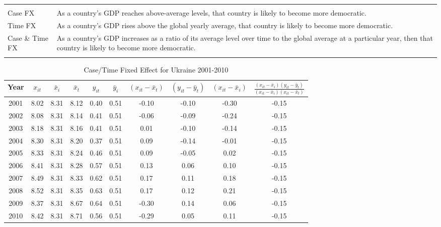 \documentclass{article}[12pt]
\begin{document}
\begin{tabular}{lp{14cm}}
	& \\
	Case FX & As a country's GDP reaches above-average levels, that country is likely to become more democratic. \\[1em]
	Time FX & As a country's GDP rises above the global yearly average, that country is likely to become more democratic. \\[1em]
	Case \& Time FX & As a country's GDP increases as a ratio of its average level over time to the global average at a particular year, then that country is likely to become more democratic.\\
	& \\
\end{tabular}

\begin{table}[ht]
	\centering
	
	\begin{tabular}{cccccccccc}
		
		Year & $x_{it}$ & $\bar{x}_i$ & $\bar{x}_t$ & $y_{it}$ & $\bar{y}_i$ &  $(x_{it}  - \bar{x}_t)$ & $(y_{it} - \bar{y}_t)$ & $(x_{it}  - \bar{x}_i)$ & $\frac{(x_{it}  - \bar{x}_i)(y_{it} - \bar{y}_t)}{(x_{it}  - \bar{x}_i)(x_{it} - \bar{x}_t)}$ \\
		\midrule
		2001 & 8.02 & 8.31 & 8.12 & 0.40 & 0.51 & -0.10 & -0.10 & -0.30 & -0.15 \\ 2002 & 8.08 & 8.31 & 8.14 & 0.41 & 0.51 & -0.06 & -0.09 & -0.24 & -0.15 \\ 2003 & 8.18 & 8.31 & 8.16 & 0.41 & 0.51 & 0.01 & -0.10 & -0.14 & -0.15 \\ 2004 & 8.30 & 8.31 & 8.20 & 0.37 & 0.51 & 0.09 & -0.14 & -0.01 & -0.15 \\ 2005 & 8.33 & 8.31 & 8.24 & 0.46 & 0.51 & 0.09 & -0.05 & 0.02 & -0.15 \\ 2006 & 8.41 & 8.31 & 8.28 & 0.57 & 0.51 & 0.13 & 0.06 & 0.10 & -0.15 \\ 2007 & 8.49 & 8.31 & 8.33 & 0.62 & 0.51 & 0.17 & 0.11 & 0.18 & -0.15 \\ 2008 & 8.52 & 8.31 & 8.35 & 0.63 & 0.51 & 0.17 & 0.12 & 0.21 & -0.15 \\ 2009 & 8.37 & 8.31 & 8.67 & 0.64 & 0.51 & -0.30 & 0.14 & 0.06 & -0.15 \\ 2010 & 8.42 & 8.31 & 8.71 & 0.56 & 0.51 & -0.29 & 0.05 & 0.11 & -0.15 \\
		
	\end{tabular}
	\caption{Case/Time Fixed Effect for Ukraine 2001-2010}\label{Ukraine_table}
\end{table}
\end{document}
